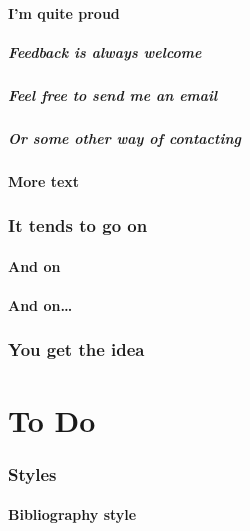 \documentclass[12pt,a4paper]{csum}
\begin{document}
        \subsection{I'm quite proud}
        \lipsum[24-25]
            \subsubsection{Feedback is always welcome}
            \lipsum[26]
            \subsubsection{Feel free to send me an email}
            \lipsum[27]
            \subsubsection{Or some other way of contacting}
            \lipsum[28-29]
        \subsection{More text}
        \lipsum[30-31]
    \section{It tends to go on}
        \lipsum[32]
        \subsection{And on}
        \lipsum[33]
        \subsection{And on\ldots}
        \lipsum[34]
    \section{You get the idea}
    \lipsum[35-37]
\part{To Do}

    \section{Styles}

        \subsection{Bibliography style}
        \lipsum[39]
\end{document}
